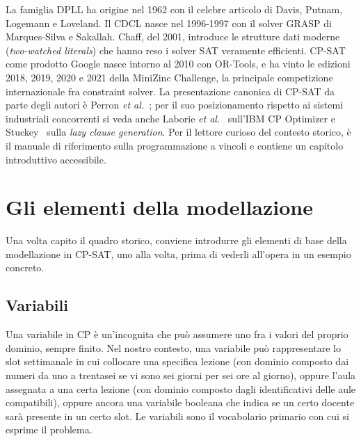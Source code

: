 \begin{storiabox}
La famiglia DPLL ha origine nel 1962 con il celebre
articolo di Davis, Putnam, Logemann e Loveland. Il CDCL
nasce nel 1996-1997 con il solver GRASP di Marques-Silva e
Sakallah. Chaff, del 2001, introduce le strutture dati
moderne (\emph{two-watched literals}) che hanno reso i
solver SAT veramente efficienti. CP-SAT come prodotto
Google nasce intorno al 2010 con OR-Tools, e ha vinto le
edizioni 2018, 2019, 2020 e 2021 della MiniZinc Challenge,
la principale competizione internazionale fra constraint
solver. La presentazione canonica di CP-SAT da parte degli
autori \`e Perron \emph{et al.}~\parencite{perron2011}; per il
suo posizionamento rispetto ai sistemi industriali concorrenti
si veda anche Laborie \emph{et al.}~\parencite{laborie2018}
sull'IBM CP Optimizer e
Stuckey~\parencite{stuckey2010} sulla \emph{lazy clause
generation}. Per il lettore curioso del contesto storico,
\cite{rossi2006} \`e il manuale di riferimento sulla
programmazione a vincoli e \cite{russell2020} contiene un
capitolo introduttivo accessibile.
\end{storiabox}


\section{Gli elementi della modellazione}

Una volta capito il quadro storico, conviene introdurre gli
elementi di base della modellazione in CP-SAT, uno alla
volta, prima di vederli all'opera in un esempio concreto.

\subsection{Variabili}

Una variabile in CP \`e un'incognita che pu\`o assumere uno
fra i valori del proprio dominio, sempre finito. Nel nostro
contesto, una variabile pu\`o rappresentare lo slot
settimanale in cui collocare una specifica lezione (con
dominio composto dai numeri da uno a trentasei se vi sono
sei giorni per sei ore al giorno), oppure l'aula assegnata a
una certa lezione (con dominio composto dagli identificativi
delle aule compatibili), oppure ancora una variabile booleana
che indica se un certo docente sar\`a presente in un certo
slot. Le variabili sono il vocabolario primario con cui si
esprime il problema.


